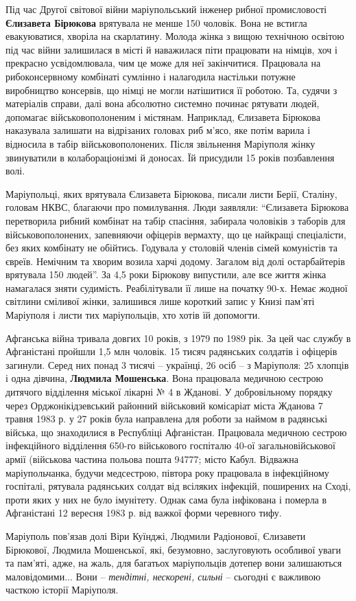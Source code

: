 Під час Другої світової війни маріупольський інженер рибної промисловості
\textbf{Єлизавета Бірюкова} врятувала не менше 150 чоловік. Вона не встигла
евакуюватися, хворіла на скарлатину. Молода жінка з вищою технічною освітою під
час війни залишилася в місті й наважилася піти працювати на німців, хоч і
прекрасно усвідомлювала, чим це може для неї закінчитися. Працювала на
рибоконсервному комбінаті сумлінно і налагодила настільки потужне виробництво
консервів, що німці не могли натішитися її роботою. Та, судячи з матеріалів
справи, далі вона абсолютно системно починає рятувати людей, допомагає
військовополоненим і містянам. Наприклад, Єлизавета Бірюкова наказувала
залишати на відрізаних головах риб м'ясо, яке потім варила і відносила в табір
військовополонених. Після звільнення Маріуполя жінку звинуватили в
колабораціонізмі й доносах. Їй присудили 15 років позбавлення волі.

Маріупольці, яких врятувала Єлизавета Бірюкова, писали листи Берії, Сталіну,
головам НКВС, благаючи про помилування. Люди заявляли: \enquote{Єлизавета Бірюкова
перетворила рибний комбінат на табір спасіння, забирала чоловіків з таборів для
військовополонених, запевняючи офіцерів вермахту, що це найкращі спеціалісти,
без яких комбінату не обійтись. Годувала у столовій членів сімей комуністів та
євреїв. Немічним та хворим возила харчі додому. Загалом від долі остарбайтерів
врятувала 150 людей}. За 4,5 роки Бірюкову випустили, але все життя жінка
намагалася зняти судимість. Реабілітували її лише на початку 90-х. Немає жодної
світлини сміливої жінки, залишився лише короткий запис у Книзі пам'яті
Маріуполя і листи тих маріупольців, хто хотів їй допомогти.

Афганська війна тривала довгих 10 років, з 1979 по 1989 рік. За цей час службу
в Афганістані пройшли 1,5 млн чоловік. 15 тисяч радянських солдатів і офіцерів
загинули. Серед них понад 3 тисячі – українці, 26 осіб – з Маріуполя: 25
хлопців і одна дівчина, \textbf{Людмила Мошенська}. Вона працювала медичною сестрою
дитячого відділення міської лікарні № 4 в Жданові. У добровільному порядку
через Орджонікідзевський районний військовий комісаріат міста Жданова 7 травня
1983 р. у 27 років була направлена для роботи за наймом в радянські війська, що
знаходилися в Республіці Афганістан. Працювала медичною сестрою інфекційного
відділення 650-го військового госпіталю 40-ої загальновійськової армії
(військова частина польова пошта 94777; місто Кабул. Відважна маріупольчанка,
будучи медсестрою, півтора року працювала в інфекційному госпіталі, рятувала
радянських солдат від всіляких інфекцій, поширених на Сході, проти яких у них
не було імунітету. Однак сама була інфікована і померла в Афганістані 12
вересня 1983 р. від важкої форми черевного тифу.


Маріуполь пов'язав долі Віри Куїнджі, Людмили Радіонової, Єлизавети Бірюкової,
Людмила Мошенської, які, безумовно, заслуговують особливої уваги та пам'яті,
адже, на жаль, для багатьох маріупольців дотепер вони залишаються маловідомими...
Вони – \emph{тендітні, нескорені, сильні} – сьогодні є важливою часткою історії
Маріуполя.
